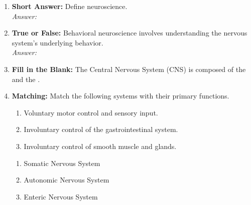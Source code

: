 \begin{enumerate}[label=\textbf{Q1.1.\arabic*}]
      \item \textbf{Short Answer:} Define neuroscience. \\
            \textit{Answer:} \\%

      \item \textbf{True or False:} Behavioral neuroscience involves understanding the nervous system’s underlying behavior. \\
            \textit{Answer:} %

      \item \textbf{Fill in the Blank:} The Central Nervous System (CNS) is composed of the \underline{\hspace{2cm}} and the \underline{\hspace{2cm}}.
            \\

      \item \textbf{Matching:} Match the following systems with their primary functions.
            \begin{wordbox}
                  \begin{enumerate}[label=(\roman*)]
                        \item Voluntary motor control and sensory input.
                        \item Involuntary control of the gastrointestinal system.
                        \item Involuntary control of smooth muscle and glands.
                  \end{enumerate}
            \end{wordbox}
            \begin{enumerate}[label=(\alph*)]
                  \item Somatic Nervous System \quad \dotfill \quad \underline{\hspace{3cm}}\\[0.5em]
                  \item Autonomic Nervous System \quad \dotfill \quad \underline{\hspace{3cm}}\\[0.5em]
                  \item Enteric Nervous System \quad \dotfill \quad \underline{\hspace{3cm}}
            \end{enumerate}


\end{enumerate}
